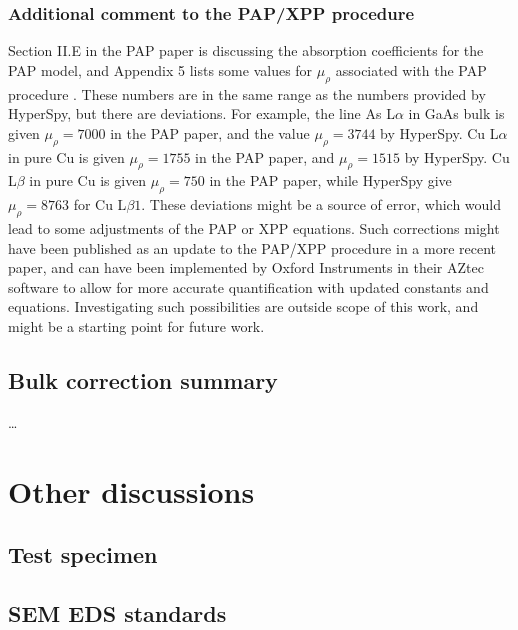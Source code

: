 \subsubsection{Additional comment to the PAP/XPP procedure}

Section II.E in the PAP paper is discussing the absorption coefficients for the PAP model, and Appendix 5 lists some values for $\mu_\rho$ associated with the PAP procedure \cite{pap_1991}.
These numbers are in the same range as the numbers provided by HyperSpy, but there are deviations.
For example, the line As L$\alpha$ in GaAs bulk is given $\mu_\rho = 7000$ in the PAP paper, and the value $\mu_\rho = 3744$ by HyperSpy.
Cu L$\alpha$ in pure Cu is given $\mu_\rho = 1755$ in the PAP paper, and $\mu_\rho = 1515$ by HyperSpy.
Cu L$\beta$ in pure Cu is given $\mu_\rho = 750$ in the PAP paper, while HyperSpy give $\mu_\rho = 8763$ for Cu L$\beta1$.
These deviations might be a source of error, which would lead to some adjustments of the PAP or XPP equations.
Such corrections might have been published as an update to the PAP/XPP procedure in a more recent paper, and can have been implemented by Oxford Instruments in their AZtec software to allow for more accurate quantification with updated constants and equations.
Investigating such possibilities are outside scope of this work, and might be a starting point for future work.



\subsection{Bulk correction summary}
\label{discussion:bulk_corrections:summary}

\dots










\section{Other discussions}
\label{discussion:other}

\subsection{Test specimen}
\label{discussion:other:test_specimen}

\subsection{SEM EDS standards}
\label{discussion:other:sem_eds_standards}

